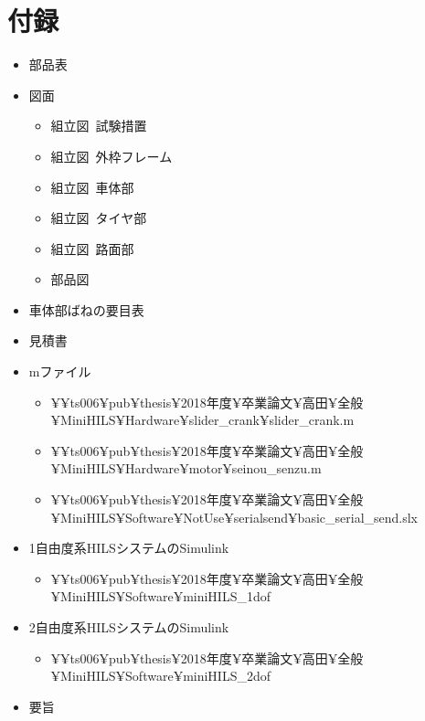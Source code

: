 \documentclass[a4paper,12pt]{article_vdlab_sotsuron}
\begin{document}
\section*{付録}
\begin{itemize}
\item 部品表
\item 図面
  \begin{itemize}
    \item 組立図~試験措置
    \item 組立図~外枠フレーム
    \item 組立図~車体部
    \item 組立図~タイヤ部
    \item 組立図~路面部
    \item 部品図
  \end{itemize}
\item 車体部ばねの要目表
\item 見積書
\item mファイル
  \begin{itemize}
    \item ¥¥ts006¥pub¥thesis¥2018年度¥卒業論文¥高田¥全般¥MiniHILS¥Hardware¥slider\_crank¥slider\_crank.m
    \item ¥¥ts006¥pub¥thesis¥2018年度¥卒業論文¥高田¥全般¥MiniHILS¥Hardware¥motor¥seinou\_senzu.m
    \item ¥¥ts006¥pub¥thesis¥2018年度¥卒業論文¥高田¥全般¥MiniHILS¥Software¥NotUse¥serialsend¥basic\_serial\_send.slx
  \end{itemize}
\item 1自由度系HILSシステムのSimulink
  \begin{itemize}
    \item ¥¥ts006¥pub¥thesis¥2018年度¥卒業論文¥高田¥全般¥MiniHILS¥Software¥miniHILS\_1dof
  \end{itemize}
\item 2自由度系HILSシステムのSimulink
  \begin{itemize}
    \item ¥¥ts006¥pub¥thesis¥2018年度¥卒業論文¥高田¥全般¥MiniHILS¥Software¥miniHILS\_2dof
  \end{itemize}
\item 要旨
\end{itemize}
\end{document}
